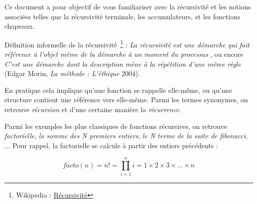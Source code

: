 \documentclass[11pt,a4paper]{article}
\begin{document}
\EncadreTitre

\bigskip


%
%

\bigskip


Ce document a pour objectif de vous familiariser avec la récursivité et les notions associées telles que la récursivité terminale, les accumulateurs, et les fonctions chapeaux.

\bigskip

Définition informelle de la récursivité~\footnote{Wikipedia : \href{https://fr.wikipedia.org/wiki/R\%C3\%A9cursivit\%C3\%A9}{Récursivité}} : \og \textit{La récursivité est une démarche qui fait référence à l'objet même de la démarche à un moment du processus} \fg{}, ou encore \og \textit{C'est une démarche dont la description mène à la répétition d'une même règle} \fg{} (Edgar Morin, \textit{La méthode : L'éthique} 2004).

\medskip

En pratique cela implique qu'une fonction se rappelle elle-même, ou qu'une structure contient une référence vers elle-même.
Parmi les termes synonymes, on retrouve \textit{récursion} et d'une certaine manière la \textit{récurrence}.

\medskip

Parmi les exemples les plus classiques de fonctions récursives, on retrouve \textit{factorielle}, \textit{la somme des N premiers entiers}, \textit{le N terme de la suite de fibonacci}, ...
Pour rappel, la factorielle se calcule à partir des entiers précédents :
%
\begin{center}
\[ facto(n) = n! = \prod_{i=1}^{n} i = 1 \times 2 \times 3 \times \text{...} \times n \]
\end{center}
\end{document}
